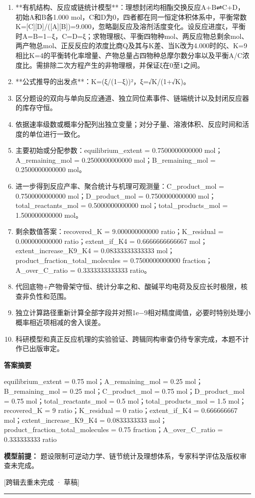 \documentclass[UTF8,11pt,a4paper]{ctexart}
\begin{document}
\begin{enumerate}
\item **有机结构、反应或链统计模型**：理想封闭均相酯交换反应A+B⇌C+D，初始A和B各1.000 mol，C和D为0，四者都在同一恒定体积体系中，平衡常数K=[C][D]/([A][B])=9.000，忽略副反应及溶剂活度变化。设反应进度ξ，平衡时A=B=1−ξ，C=D=ξ；求物理根ξ、平衡四物种mol、两反应物总剩余mol、两产物总mol、正反反应的浓度比商Q及其与K差、当K改为4.000时的ξ、K=9相比K=4的平衡转化率增量、产物总量占四物种总摩尔数分率以及平衡A/C浓度比。需排除二次方程产生的非物理根，并保证ξ在0至1之间。
\item **公式推导的出发点**：K=(ξ/(1−ξ))²，ξ=√K/(1+√K)。
\item 区分题设的双向与单向反应通道、独立同位素事件、链端统计以及封闭反应器的库存守恒。
\item 依据速率级数或概率分配列出独立变量；对分子量、溶液体积、反应时间和活度的单位进行一致化。
\item 主要初始或分配参数：equilibrium\_extent = 0.7500000000000 mol；A\_remaining\_mol = 0.2500000000000 mol；B\_remaining\_mol = 0.2500000000000 mol。
\item 进一步得到反应产率、聚合统计与机理可观测量：C\_product\_mol = 0.7500000000000 mol；D\_product\_mol = 0.7500000000000 mol；total\_reactants\_mol = 0.5000000000000 mol；total\_products\_mol = 1.500000000000 mol。
\item 剩余数值答案：recovered\_K = 9.000000000000 ratio；K\_residual = 0.000000000000 ratio；extent\_if\_K4 = 0.6666666666667 mol；extent\_increase\_K9\_K4 = 0.08333333333333 mol；product\_fraction\_total\_molecules = 0.7500000000000 fraction；A\_over\_C\_ratio = 0.3333333333333 ratio。
\item 代回底物+产物骨架守恒、统计分率之和、酸碱平均电荷及反应长时极限，核查非负性和范围。
\item 独立计算路径重新计算全部字段并对照1e−9相对精度阈值，必要时特别处理小概率相近项相减的舍入误差。
\item 科研模型和真正反应机理的实验验证、跨辑同构审查仍待专家完成，本题不计作已出版审定。
\end{enumerate}
\noindent\textbf{答案摘要}\par
equilibrium\_extent = 0.75 mol；A\_remaining\_mol = 0.25 mol；B\_remaining\_mol = 0.25 mol；C\_product\_mol = 0.75 mol；D\_product\_mol = 0.75 mol；total\_reactants\_mol = 0.5 mol；total\_products\_mol = 1.5 mol；recovered\_K = 9 ratio；K\_residual = 0 ratio；extent\_if\_K4 = 0.666666667 mol；extent\_increase\_K9\_K4 = 0.0833333333 mol；product\_fraction\_total\_molecules = 0.75 fraction；A\_over\_C\_ratio = 0.333333333 ratio\par
\noindent\textbf{模型前提：}
题设限制可逆动力学、链节统计及理想体系，专家科学评估及版权审查未完成。\par
\noindent\textcolor{red!65!black}{[跨辑去重未完成 · 草稿]} \par
\medskip\hrule\medskip
{}
\end{document}
